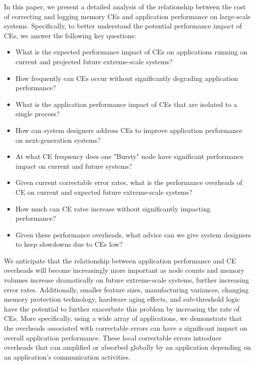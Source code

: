 

In this paper, we present a detailed analysis of the relationship between the cost of
correcting and logging memory CEs and application performance on large-scale systems.
Specifically, to better understand the potential performance impact of CEs, we answer the 
following key questions:

\begin{itemize}
  \item What is the expected performance impact of CEs on applications running on current and 
        projected future extreme-scale systems?
  \item How frequently can CEs occur without significantly degrading application performance?
  \item What is the application performance impact of CEs that are isolated to a single process?
  \item How can system designers address CEs to improve application performance on next-generation systems?
\end{itemize}
\begin{itemize}
        \item At what CE frequency does one "Bursty" node have significant
              performance impact on current and future systems?
        \item Given current correctable error rates, what is the performance
              overheads of CE on current and expected future extreme-scale systems?
        \item How much can CE rates increase without significantly impacting
              performance?
        \item Given these performance overheads, what advice can we give system
              designers to keep slowdowns due to CEs low?
\end{itemize}

We anticipate that the relationship between application performance and CE 
overheads will become increasingly more important as node counts and memory volumes increase
dramatically on future extreme-scale systems, further increasing error rates.
Additionally, smaller feature sizes, manufacturing variances, changing memory
protection technology, hardware aging effects, and sub-threshold logic have the
potential to further exacerbate this problem by increasing the rate of CEs.
More specifically, using a wide array of
applications, we demonstrate that the overheads associated with  correctable
errors can have a significant impact on overall application performance.  These
local correctable errors introduce overheads that can amplified or absorbed
globally by an application depending on an application's communication
activities. 

